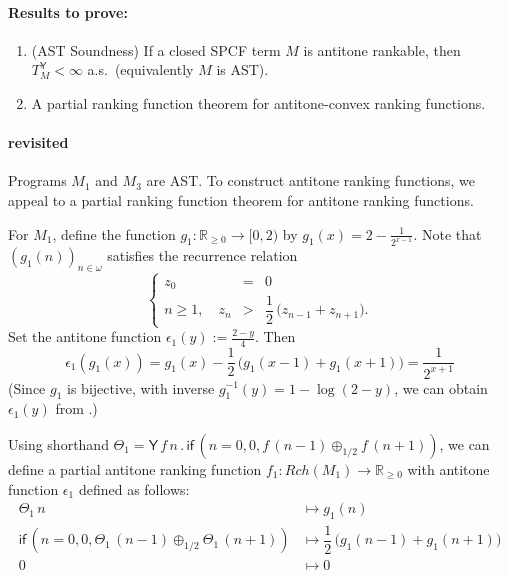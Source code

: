 \documentclass{article}
\newcommand{\Real}{\mathbb{R}}
\newcommand{\nnReal}{\mathbb{R}_{{\geq}0}}
\newcommand{\tY}{\textsf{Y}}
\newcommand{\tif}[3]{\textsf{if}\,(#1, #2, #3)} %
\theoremstyle{definition}
\theoremstyle{lemma}
\theoremstyle{remark}
\begin{document}
\paragraph{Results to prove:}
\begin{enumerate}
\item (AST Soundness) If a closed SPCF term $M$ is antitone rankable, then $T^{\tY}_M < \infty$ a.s.~(equivalently $M$ is AST). 

\item A partial ranking function theorem for antitone-convex ranking functions. 
\end{enumerate}

\paragraph{ revisited}

Programs $M_1$ and $M_3$ are AST.
To construct antitone ranking functions, we appeal  to a partial ranking function theorem for antitone ranking functions.

For $M_1$, define the function $g_1 : \nnReal \to [0, 2)$ by $g_1(x) = 2 - \frac{1}{2^{x-1}}$.
Note that $(g_1 (n))_{n \in \omega}$ satisfies the recurrence relation
\[
\left\{
\begin{array}{rll}
z_0 &=& 0\\
n \geq 1, \quad z_n &>& \dfrac{1}{2} \, \big( z_{n-1} + z_{n+1}\big).
\end{array}
\right.
\]
Set the antitone function $\epsilon_1 (y) :=  \frac{2-y}{4}$.
Then
\begin{equation}
\epsilon_1(g_1(x)) = g_1(x) - \dfrac{1}{2} \, \big(g_1(x-1) + g_1(x+1)\big) = \dfrac{1}{2^{x+1}}
\label{eqn:epsilon g M1}
\end{equation}
(Since $g_1$ is bijective, with inverse $g_1^{-1}(y) = 1 - \log (2-y)$, we can obtain $\epsilon_1(y)$ from .) 

Using shorthand 
$\Theta_1 = \tY \, f \, n \, . \, 
\tif{n = 0}{0}{f \, (n - 1) \oplus_{1/2} f \, (n + 1)}$, 
we can define a partial antitone ranking function $f_1 : \mathit{Rch}(M_1) \to \nnReal$ with antitone function $\epsilon_1$ defined as follows:
\begin{align*}
{\Theta_1} \, n 
&\mapsto 
g_1(n)
\\
\tif{n = 0}{0}{\Theta_1 \, (n - 1) \oplus_{1/2} \Theta_1 \, (n + 1)}
&\mapsto
\dfrac{1}{2} \, \big(g_1(n-1) + g_1(n+1)\big)
\\
0 &\mapsto 0
\end{align*}
\end{document}
